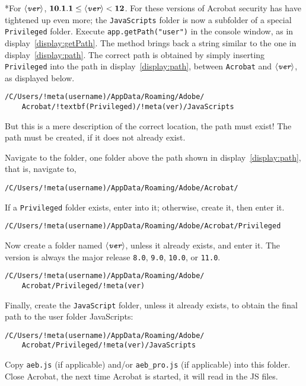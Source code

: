 \documentclass{article}
\makeatletter
\renewcommand{\paragraph}
    {\@startsection{paragraph}{4}{0pt}{6pt}{-3pt}
    {\normalfont\normalsize\bfseries}}
\def\app#1{\textsf{#1}}
\def\amtIndent{\parindent}
\def\meta#1{$\langle\textit{\texttt{#1}}\rangle$}
\def\SC#1{{\small#1}}
\makeatother
\begin{document}
\paragraph*{{\Stepii}For $\mathbf{\text{\meta{ver}}}$, $\mathbf{10.1.1 \le
\text{\meta{ver}} < 12}$.} For these versions of \app{Acrobat} security has
have tightened up even more; the \texttt{JavaScripts} folder is now a
subfolder of a special \texttt{Privileged} folder. Execute
\texttt{app.getPath("user")} in the console window, as in
display~\eqref{display:getPath}. The method brings back a string similar to
the one in display~\eqref{display:path}. The correct path is obtained by
simply inserting \texttt{Privileged} into the path in
display~\eqref{display:path}, between \texttt{Acrobat} and \meta{ver}, as
displayed below.
\begin{Verbatim}[xleftmargin=\amtIndent,fontsize=\small,commandchars=!()]
/C/Users/!meta(username)/AppData/Roaming/Adobe/
    Acrobat/!textbf(Privileged)/!meta(ver)/JavaScripts
\end{Verbatim}
But this is a mere description of the correct location, the path must
exist! The path must be created, if it does not already exist.

Navigate to the folder, one folder above the path shown in
display~\eqref{display:path}, that is, navigate to,
\begin{Verbatim}[xleftmargin=\amtIndent,fontsize=\small,commandchars=!()]
/C/Users/!meta(username)/AppData/Roaming/Adobe/Acrobat/
\end{Verbatim}
If a \texttt{Privileged} folder exists, enter into it; otherwise, create
it, then enter it.
\begin{Verbatim}[xleftmargin=\amtIndent,fontsize=\small,commandchars=!()]
/C/Users/!meta(username)/AppData/Roaming/Adobe/Acrobat/Privileged
\end{Verbatim}
Now create a folder named \meta{ver}, unless it already exists, and enter
it. The version is always the major release \texttt{8.0}, \texttt{9.0},
\texttt{10.0}, or \texttt{11.0}.
\begin{Verbatim}[xleftmargin=\amtIndent,fontsize=\small,commandchars=!()]
/C/Users/!meta(username)/AppData/Roaming/Adobe/
    Acrobat/Privileged/!meta(ver)
\end{Verbatim}
Finally, create the \texttt{JavaScript} folder, unless it already exists,
to obtain the final path to the user folder JavaScripts:
\begin{Verbatim}[xleftmargin=\amtIndent,fontsize=\small,commandchars=!()]
/C/Users/!meta(username)/AppData/Roaming/Adobe/
    Acrobat/Privileged/!meta(ver)/JavaScripts
\end{Verbatim}
Copy \texttt{aeb.js} (if applicable) and/or \texttt{aeb\_pro.js} (if
applicable) into this folder. Close \textsf{Acrobat}, the next time
\textsf{Acrobat} is started, it will read in the \SC{JS} files.
\end{document}

